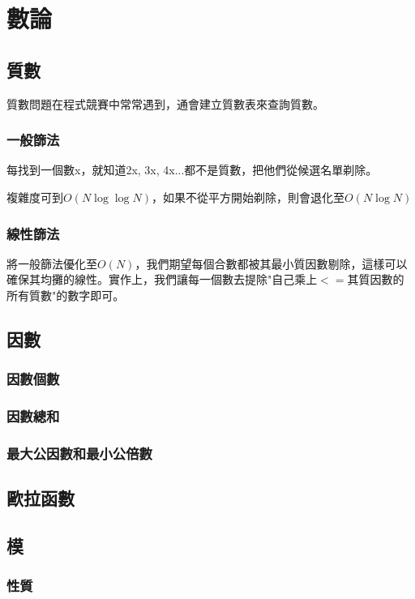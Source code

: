\section{數論}
\subsection{質數}
質數問題在程式競賽中常常遇到，通會建立質數表來查詢質數。
\subsubsection{一般篩法}
每找到一個數x，就知道2x, 3x, 4x...都不是質數，把他們從候選名單剃除。

複雜度可到$O(N\log\log N)$，如果不從平方開始剃除，則會退化至$O(N\log N)$
\subsubsection{線性篩法}
將一般篩法優化至$O(N)$，我們期望每個合數都被其最小質因數剔除，這樣可以確保其均攤的線性。實作上，我們讓每一個數去提除"自己乘上$<=$其質因數的所有質數"的數字即可。

\subsection{因數}
\subsubsection{因數個數}

\subsubsection{因數總和}

\subsubsection{最大公因數和最小公倍數}

\subsection{歐拉函數}

\subsection{模}
\subsubsection{性質}

